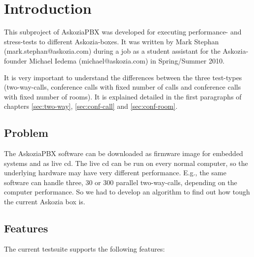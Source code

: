 \section{Introduction}
\label{sec:introduction}

This subproject of AskoziaPBX was developed for executing performance- and stress-tests to different Askozia-boxes.
It was written by Mark Stephan \newline (mark.stephan@askozia.com) during a job as a student
assistant for the Askozia-founder Michael Iedema (michael@askozia.com) in Spring/Summer 2010. 

It is very important to understand the differences between the three test-types (two-way-calls, conference calls with fixed number of
calls and conference calls with fixed number of rooms). It is explained detailed in the first paragraphs of chapters
\ref{sec:two-way}, \ref{sec:conf-call} and \ref{sec:conf-room}.

\subsection{Problem}%
The AskoziaPBX software can be downloaded as firmware image for embedded systems and as live cd. The live cd can be run on every normal computer, so the underlying hardware may have very different performance. E.g., the same software can handle three, 30 or 300 parallel two-way-calls, depending on the computer performance. So we had to develop an algorithm to find out how tough the current Askozia box is.
 
\subsection{Features}%
The current testsuite supports the following features:

